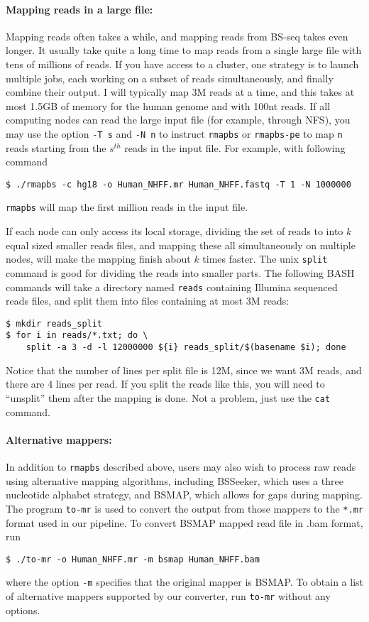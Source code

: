 \documentclass[10pt]{article}
\newcommand{\prog}[1]{\texttt{#1}}
\newcommand{\fn}[1]{\texttt{#1}}
\newcommand{\op}[1]{\texttt{#1}}
\begin{document}
\paragraph{Mapping reads in a large file:} 
Mapping reads often takes a while, and mapping reads from BS-seq takes
even longer. It usually take quite a long time to map reads from a
single large file with tens of millions of reads. If you have access
to a cluster, one strategy is to launch multiple jobs, each working on
a subset of reads simultaneously, and finally combine their output. I
will typically map 3M reads at a time, and this takes at most 1.5GB of
memory for the human genome and with 100nt reads. If all computing
nodes can read the large input file (for example, through NFS), you
may use the option \op{-T s} and \op{-N n} to instruct \prog{rmapbs}
or \prog{rmapbs-pe} to map \op{n} reads starting from the $s^{th}$
reads in the input file. For example, with following command
\begin{verbatim}
$ ./rmapbs -c hg18 -o Human_NHFF.mr Human_NHFF.fastq -T 1 -N 1000000
\end{verbatim}
\prog{rmapbs} will map the first million reads in the input file.   
  
If each node can only access its local storage, dividing the set of
reads to into $k$ equal sized smaller reads files, and mapping these
all simultaneously on multiple nodes, will make the mapping finish
about $k$ times faster.  The unix \prog{split} command is good for
dividing the reads into smaller parts. The following BASH commands
will take a directory named \fn{reads} containing Illumina sequenced
reads files, and split them into files containing at most 3M reads:
\begin{verbatim}
$ mkdir reads_split
$ for i in reads/*.txt; do \
    split -a 3 -d -l 12000000 ${i} reads_split/$(basename $i); done
\end{verbatim}
Notice that the number of lines per split file is 12M, since we want
3M reads, and there are 4 lines per read. If you split the reads like
this, you will need to ``unsplit'' them after the mapping is done. Not
a problem, just use the \prog{cat} command.

\paragraph{Alternative mappers:}
\label{sec:alternative-mappers}
In addition to \prog{rmapbs} described above, users may also wish
to process raw reads using alternative mapping algorithms, including
BSSeeker, which uses a three nucleotide alphabet strategy, and BSMAP,
which allows for gaps during mapping. The program \prog{to-mr} is used
to convert the output from those mappers to the \fn{*.mr} format used in
our pipeline. To convert BSMAP mapped read file in .bam format, run
\begin{verbatim}
$ ./to-mr -o Human_NHFF.mr -m bsmap Human_NHFF.bam
\end{verbatim}
where the option \op{-m} specifies that the original mapper is
BSMAP. To obtain a list of alternative mappers supported by our
converter, run \prog{to-mr} without any options. 
\end{document}
